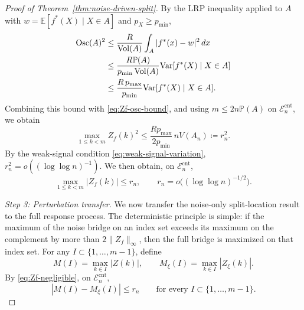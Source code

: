 \documentclass[11pt]{article}
\theoremstyle{plain}
\theoremstyle{definition}
\theoremstyle{remark}
\theoremstyle{plain}
\renewcommand{\P}{\mathbb{P}}
\newcommand{\E}{\mathbb{E}}
\newcommand{\Var}{\textnormal{Var}}
\DeclareMathOperator{\Vol}{Vol}
\newcommand{\1}{\mathbbm{1}}
\newcommand{\Osc}{\operatorname{Osc}}
\begin{document}
\begin{proof}[Proof of Theorem~\ref{thm:noise-driven-split}]
By the LRP inequality applied to $A$ with $w=\E[f^*(X)\mid X\in A]$
and $p_X\ge p_{\min}$,
\begin{align*}
    \Osc(A)^2
    &\le
    \frac{R}{\Vol(A)}
    \int_A|f^*(x)-w|^2\,dx \\
    &\le
    \frac{R\P(A)}{p_{\min}\Vol(A)}
    \Var[f^*(X)\mid X\in A] \\
    &\le
    \frac{R\,p_{\max}}{p_{\min}}
    \Var[f^*(X)\mid X\in A].
\end{align*}
Combining this bound with \eqref{eq:Zf-osc-bound}, and using $m\le 2n\P(A)$ on $\mathcal E_n^{\mathrm{cnt}}$, we obtain
\begin{equation}\label{eq:rn-LRP}
    \max_{1\le k<m}Z_f(k)^2
    \le
    \frac{Rp_{\max}}{2p_{\min}}\,
    nV(A_n)\coloneqq r_{n}^2.
\end{equation}
By the weak-signal condition \eqref{eq:weak-signal-variation}, $r_{n}^2=o((\log\log n)^{-1})$.
We then obtain, on $\mathcal E_n^{\mathrm{cnt}}$,
\begin{equation}\label{eq:Zf-negligible}
    \max_{1\le k<m}|Z_f(k)|\le r_n,
    \qquad
    r_n=o\bigl((\log\log n)^{-1/2}\bigr).
\end{equation}

\medskip\noindent\textit{Step 3: Perturbation transfer.}
We now transfer the noise-only split-location result to the full response
process. The deterministic principle is simple: if the maximum of the noise
bridge on an index set exceeds its maximum on the complement by more than
$2\|Z_f\|_\infty$, then the full bridge is maximized on that index set.
For any $I\subset\{1,\ldots,m-1\}$, define
\[
    M(I)=\max_{k\in I}|Z(k)|,\qquad
    M_\xi(I)=\max_{k\in I}|Z_\xi(k)|.
\]
By \eqref{eq:Zf-negligible}, on $\mathcal E_n^{\mathrm{cnt}}$,
\begin{equation}\label{eq:restricted-max-perturb-thm35}
    |M(I)-M_\xi(I)|\le r_n
    \qquad
    \text{for every }I\subset\{1,\ldots,m-1\}.
\end{equation}


\end{proof}
\end{document}
